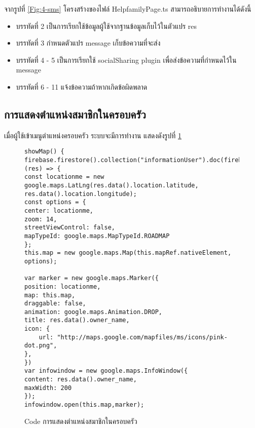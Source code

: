 จากรูปที่ \ref{Fig:4-sms} โครงสร้างของไฟล์ HelpfamilyPage.ts สามารถอธิบายการทำงานได้ดังนี้
\begin{itemize}[label={--}]
\item บรรทัดที่ 2 เป็นการเรียกใช้ข้อมูลผู้ใช้จากฐานข้อมูลเก็บไว้ในตัวแปร res
\item บรรทัดที่ 3 กำหนดตัวแปร message เก็บข้อความที่จะส่ง
\item บรรทัดที่ 4 - 5 เป็นการเรียกใช้ socialSharing plugin เพื่อส่งข้อความที่กำหนดไว้ใน message
\item บรรทัดที่ 6 - 11 แจ้งข้อความถ้าหากเกิดข้อผิดพลาด
\end{itemize}
\newpage



\subsection{การแสดงตำแหน่งสมาชิกในครอบครัว}
เมื่อผู้ใช้เข้าเมนูตำแหน่งครอบครัว ระบบจะมีการทำงาน แสดงดังรูปที่ \ref{Fig:4-googlemap}

\begin{figure}[H]
{\lstset{language=Pascal}
\begin{lstlisting}
showMap() {
firebase.firestore().collection("informationUser").doc(firebase.auth().currentUser.uid).get().then( (res) => {
const locationme = new google.maps.LatLng(res.data().location.latitude, res.data().location.longitude);
const options = {
center: locationme,
zoom: 14,
streetViewControl: false,
mapTypeId: google.maps.MapTypeId.ROADMAP
};
this.map = new google.maps.Map(this.mapRef.nativeElement, options);

var marker = new google.maps.Marker({
position: locationme,
map: this.map,
draggable: false,
animation: google.maps.Animation.DROP,
title: res.data().owner_name,
icon: {
	url: "http://maps.google.com/mapfiles/ms/icons/pink-dot.png",
},
})
var infowindow = new google.maps.InfoWindow({
content: res.data().owner_name,
maxWidth: 200
});
infowindow.open(this.map,marker);
\end{lstlisting}}
\caption{Code การแสดงตำแหน่งสมาชิกในครอบครัว}
\label{Fig:4-googlemap}
\end{figure}
\newpage

